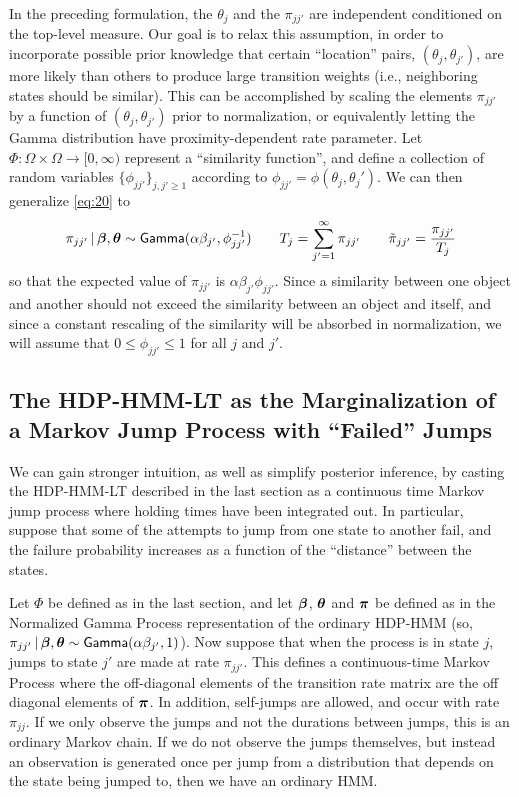 In the preceding formulation, the $\theta_j$ and the $\pi_{jj'}$ are independent
conditioned on the top-level measure.  Our goal is to relax this
assumption, in order to incorporate possible prior knowledge
that certain ``location'' pairs, $(\theta_j, \theta_{j'})$, are more likely than others to
produce large transition weights (i.e., neighboring states should be
similar).  This can be accomplished by scaling the elements
$\pi_{jj'}$ by a function of $(\theta_{j}, \theta_{j'})$ prior to
normalization, or equivalently letting the Gamma distribution have
proximity-dependent rate parameter.
Let $\Phi: \Omega \times \Omega \to [0,\infty)$ represent a
``similarity function'', and define a collection of random variables
$\{\phi_{jj'}\}_{j,j' \geq 1}$ according to $\phi_{jj'} = \phi(\theta_j, \theta_j')$.
We can then generalize \eqref{eq:20} to
\begin{align}
  \pi_{jj'} \, \vert \, \boldsymbol{\beta}, \boldsymbol{\theta} \sim \mathsf{Gamma}(\alpha \beta_{j'},\phi_{jj'}^{-1}) \qquad
  T_j = \sum_{j'=1}^{\infty} \pi_{jj'} \qquad \tilde{\pi}_{jj'} = \frac{\pi_{jj'}}{T_j}
\end{align}
so that the expected value of $\pi_{jj'}$ is
$\alpha\beta_{j'}\phi_{jj'}$.  Since a similarity between one object
and another should not exceed the similarity between an object and
itself, and since a constant rescaling of the similarity will be
absorbed in normalization, we will assume that $0 \leq \phi_{jj'} \leq 1$ for all $j$
and $j'$.

\subsection{The HDP-HMM-LT as the Marginalization of
a Markov Jump Process with ``Failed'' Jumps}
\label{sec:dist-based-filt}

We can gain stronger intuition, as well as simplify posterior
inference, by casting the HDP-HMM-LT described in the last section
as a continuous time Markov jump process where holding times have been
integrated out.  In particular, suppose that some of the attempts to jump
from one state to another fail, and the failure probability
increases as a function of the ``distance'' between the states.

Let $\Phi$ be defined as in the last section, and let 
$\boldsymbol{\beta}$, $\boldsymbol{\theta}$ and $\boldsymbol{\pi}$ be defined as in the Normalized Gamma
Process representation of the ordinary HDP-HMM (so,
  $\pi_{jj'} \, \vert \, \boldsymbol{\beta}, \boldsymbol{\theta} \sim \mathsf{Gamma}(\alpha \beta_{j'},1)$).
Now suppose that when the process is in state $j$, jumps to state
$j'$ are made at rate $\pi_{jj'}$.  This defines a continuous-time
Markov Process where the off-diagonal elements of the transition rate
matrix are the off diagonal elements of $\boldsymbol{\pi}$.  In addition,
self-jumps are allowed, and occur with rate $\pi_{jj}$.   If we only
observe the jumps and not the durations between jumps, this is an
ordinary Markov chain.  If we do not observe the jumps themselves, but
instead an observation is generated once per jump from a distribution that depends
on the state being jumped to, then we have an ordinary HMM.

